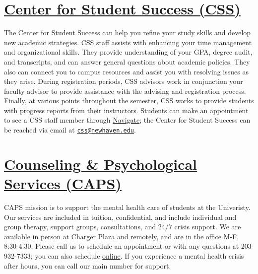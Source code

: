 \documentclass[11pt,]{article}
\begin{document}
\hypertarget{center-for-student-success-css}{%
\section{\texorpdfstring{\href{https://mycharger.newhaven.edu/web/mycharger/fysc-students?inheritRedirect=true}{Center
for Student Success
(CSS)}}{Center for Student Success (CSS)}}\label{center-for-student-success-css}}

The Center for Student Success can help you refine your study skills and
develop new academic strategies. CSS staff assists with enhancing your
time management and organizational skills. They provide understanding of
your GPA, degree audit, and transcripts, and can answer general
questions about academic policies. They also can connect you to campus
resources and assist you with resolving issues as they arise. During
registration periods, CSS advisors work in conjunction your faculty
advisor to provide assistance with the advising and registration
process. Finally, at various points throughout the semester, CSS works
to provide students with progress reports from their instructors.
Students can make an appointment to see a CSS staff member through
\href{https://mycharger.newhaven.edu/web/mycharger/for-students}{Navigate};
the Center for Student Success can be reached via email at
\href{mailto:css@newhaven.edu}{\nolinkurl{css@newhaven.edu}}.

\hypertarget{counseling-psychological-services-caps}{%
\section{\texorpdfstring{\href{https://mycharger.newhaven.edu/web/mycharger/counseling-and-psychological-services}{Counseling
\& Psychological Services
(CAPS)}}{Counseling \& Psychological Services (CAPS)}}\label{counseling-psychological-services-caps}}

CAPS mission is to support the mental health care of students at the
Univeristy. Our services are included in tuition, confidential, and
include individual and group therapy, support groups, consultations, and
24/7 crisis support. We are available in person at Charger Plaza and
remotely, and are in the office M-F, 8:30-4:30. Please call us to
schedule an appointment or with any questions at 203-932-7333; you can
also schedule
\href{https://titanium-web.newhaven.edu/TitaniumWeb-CC/}{online}. If you
experience a mental health crisis after hours, you can call our main
number for support.
\end{document}

